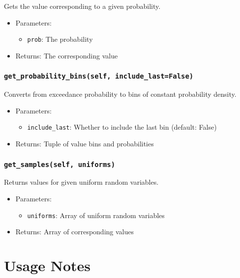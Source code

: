 \documentclass{article}
\begin{document}
Gets the value corresponding to a given probability.

\begin{itemize}
    \item Parameters:
    \begin{itemize}
        \item \texttt{prob}: The probability
    \end{itemize}
    \item Returns: The corresponding value
\end{itemize}

\subsubsection{\texttt{get\_probability\_bins(self, include\_last=False)}}

Converts from exceedance probability to bins of constant probability density.

\begin{itemize}
    \item Parameters:
    \begin{itemize}
        \item \texttt{include\_last}: Whether to include the last bin (default: False)
    \end{itemize}
    \item Returns: Tuple of value bins and probabilities
\end{itemize}

\subsubsection{\texttt{get\_samples(self, uniforms)}}

Returns values for given uniform random variables.

\begin{itemize}
    \item Parameters:
    \begin{itemize}
        \item \texttt{uniforms}: Array of uniform random variables
    \end{itemize}
    \item Returns: Array of corresponding values
\end{itemize}

\section{Usage Notes}
\end{document}
